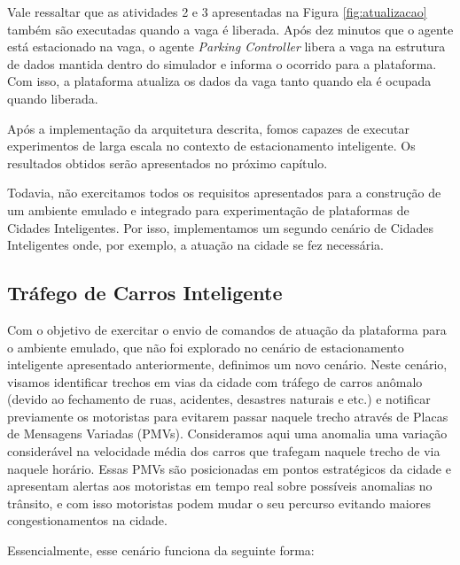 Vale ressaltar que as atividades 2 e 3 apresentadas na Figura \ref{fig:atualizacao} também são executadas quando a vaga é liberada.
Após dez minutos que o agente está estacionado na vaga, o agente \textit{Parking Controller} libera a vaga na estrutura de dados mantida dentro do simulador e informa o
ocorrido para a plataforma.
Com isso, a plataforma atualiza os dados da vaga tanto quando ela é ocupada quando liberada.

Após a implementação da arquitetura descrita, fomos capazes de executar experimentos de larga escala no contexto de estacionamento inteligente.
Os resultados obtidos serão apresentados no próximo capítulo.

Todavia, não exercitamos todos os requisitos apresentados para a construção de um ambiente emulado e integrado para experimentação de plataformas de Cidades Inteligentes.
Por isso, implementamos um segundo cenário de Cidades Inteligentes onde, por exemplo, a atuação na cidade se fez necessária.


\subsection{Tráfego de Carros Inteligente}
\label{sec:smart_traffic}

Com o objetivo de exercitar o envio de comandos de atuação da plataforma para o ambiente emulado, que não foi explorado no cenário de estacionamento inteligente apresentado
anteriormente, definimos um novo cenário.
Neste cenário, visamos identificar trechos em vias da cidade com tráfego de carros anômalo (devido ao fechamento de ruas, acidentes, desastres naturais e etc.) e notificar
previamente os motoristas para evitarem passar naquele trecho através de Placas de Mensagens Variadas (PMVs).
Consideramos aqui uma anomalia uma variação considerável na velocidade média dos carros que trafegam naquele trecho de via naquele horário.
Essas PMVs são posicionadas em pontos estratégicos da cidade e apresentam alertas aos motoristas em tempo real sobre possíveis anomalias no trânsito, e com isso motoristas
podem mudar o seu percurso evitando maiores congestionamentos na cidade.

Essencialmente, esse cenário funciona da seguinte forma:

